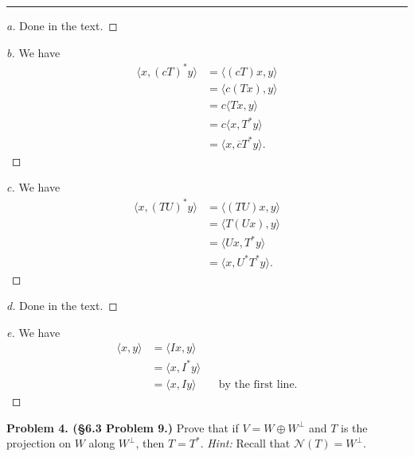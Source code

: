 \documentclass[leqno]{article}
\theoremstyle{nonumberplain}
\newtheorem{proof}{Proof}
\begin{document}
\noindent\rule[0.5ex]{\linewidth}{1pt}

\begin{proof}[a]
Done in the text.
\end{proof}

\begin{proof}[b]
We have
\begin{align*}
\langle x, (cT)^* y \rangle &=\langle (cT)x,y \rangle\\
&= \langle c (Tx),y \rangle \\
&= c \langle Tx, y \rangle\\
&= c \langle x,T^* y \rangle\\
&= \langle x, \overline{c}T^* y \rangle.
\end{align*}
\end{proof}

\begin{proof}[c]
We have
\begin{align*}
\langle x, (TU)^* y \rangle &= \langle (TU)x, y \rangle\\
&= \langle T(Ux),y\rangle \\
&= \langle Ux, T^* y \rangle\\
&= \langle x, U^* T^* y \rangle.
\end{align*}
\end{proof}

\begin{proof}[d]
Done in the text.
\end{proof}

\begin{proof}[e]
We have
\begin{align*}
\langle x,y \rangle &= \langle Ix, y \rangle\\
&= \langle x,I^* y \rangle\\
&= \langle x, Iy\rangle && \textrm{by the first line.}
\end{align*}
\end{proof}

\pagebreak






\noindent\textbf{Problem 4. (\S 6.3  Problem 9.)} Prove that if $V=W\oplus W^\perp$ and $T$ is the projection on $W$ along $W^\perp$, then $T=T^*$. \emph{Hint:} Recall that $\mathcal{N}(T)=W^\perp$. 
\end{document}
